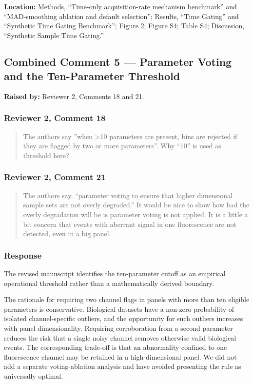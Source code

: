 \documentclass[
  11pt,
  a4paper,
]{article}
\begin{document}
\textbf{Location:} Methods, ``Time-only acquisition-rate mechanism
benchmark'' and ``MAD-smoothing ablation and default selection'';
Results, ``Time Gating'' and ``Synthetic Time Gating Benchmark''; Figure
2; Figure S4; Table S4; Discussion, ``Synthetic Sample Time Gating.''

\subsection{Combined Comment 5 --- Parameter Voting and the
Ten-Parameter
Threshold}\label{combined-comment-5--parameter-voting-and-the-ten-parameter-threshold}

\textbf{Raised by:} Reviewer 2, Comments 18 and 21.

\subsubsection{Reviewer 2, Comment 18}\label{reviewer-2-comment-18}

\begin{quote}
The authors say ''when \textgreater10 parameters are present, bins are
rejected if they are flagged by two or more parameters''. Why ``10'' is
used as threshold here?
\end{quote}

\subsubsection{Reviewer 2, Comment 21}\label{reviewer-2-comment-21}

\begin{quote}
The authors say, ``parameter voting to ensure that higher dimensional
sample sets are not overly degraded.'' It would be nice to show how bad
the overly degradation will be is parameter voting is not applied. It is
a little a bit concern that events with aberrant signal in one
fluorescence are not detected, even in a big panel.
\end{quote}

\subsubsection{Response}\label{response-4}

The revised manuscript identifies the ten-parameter cutoff as an
empirical operational threshold rather than a mathematically derived
boundary.

The rationale for requiring two channel flags in panels with more than
ten eligible parameters is conservative. Biological datasets have a
non-zero probability of isolated channel-specific outliers, and the
opportunity for such outliers increases with panel dimensionality.
Requiring corroboration from a second parameter reduces the risk that a
single noisy channel removes otherwise valid biological events. The
corresponding trade-off is that an abnormality confined to one
fluorescence channel may be retained in a high-dimensional panel. We did
not add a separate voting-ablation analysis and have avoided presenting
the rule as universally optimal.
\end{document}
